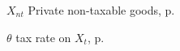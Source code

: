 \begin{eqlist}
    \item[$X_{nt}$]
    Private non-taxable goods, p.~\pageref{Xt}

    \item[$\theta$]
    tax rate on $X_t$, p.~\pageref{Xt}













\end{eqlist}